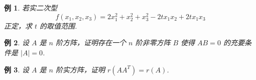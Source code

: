\documentclass[13pt]{beamer}
\newtheorem{exa}{例}
\begin{document}
\begin{frame}
\begin{exa}
若实二次型 $$f\left(x_{1}, x_{2}, x_{3}\right)=2 x_{1}^{2}+x_{2}^{2}+x_{3}^{2}-2 t x_{1} x_{2}+2 t x_{1} x_{3}$$ 正定，求 $t$ 的取值范围.
\end{exa}
\end{frame}

\begin{frame}
\begin{exa}
设 $A$ 是 $n$ 阶方阵，证明存在一个 $n$ 阶非零方阵 $B$ 使得 $A B=0$ 的充要条件是 $|A|=0$.
\end{exa}

\begin{exa}
设 $A$ 是 $n$ 阶实方阵，证明 $r\left(A A^{T}\right)=r(A)$.
\end{exa}
\end{frame}
\end{document}

